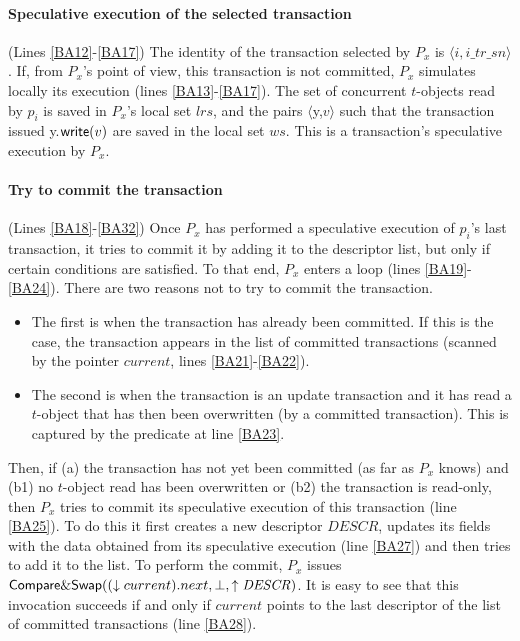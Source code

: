 \paragraph{Speculative execution of the selected  transaction} 
(Lines \ref{BA12}-\ref{BA17}) 
The identity of the transaction selected by $P_x$ is 
$\langle i,  i\_tr\_sn \rangle$. 
If,  from $P_x$'s point of view, this transaction  is not committed, $P_x$ 
simulates locally its execution (lines \ref{BA13}-\ref{BA17}).
The set of concurrent $t$-objects read by $p_i$ is  saved in $P_x$'s local
set $\mathit{lrs}$, and the  pairs $\langle${\sc y},$v\rangle$ 
such that the transaction issued {\sc y}.${\sf write}(v)$ are saved in 
the local set $ws$. This is a transaction's speculative execution by $P_x$. 

\paragraph{Try to commit the transaction}
 (Lines \ref{BA18}-\ref{BA32}) Once $P_x$ has performed a speculative
 execution of $p_i$'s  last transaction, it tries to commit  it by adding it
to the descriptor list, but only if certain conditions are satisfied.
To that end, $P_x$  enters a loop (lines \ref{BA19}-\ref{BA24}). 
There are two reasons not to try to commit the transaction.
%
\begin{itemize}
\item
The first is when  the transaction has already  been committed. 
If this is the case, the transaction  appears in the list of committed 
transactions (scanned by the pointer $current$, lines \ref{BA21}-\ref{BA22}).
%
\item
The second is when the transaction is an update transaction and it
has read a $t$-object that  has then been overwritten (by a committed 
transaction). This is  captured by the predicate at line \ref{BA23}.
\end{itemize}

Then, if (a) the  transaction has not yet been  committed 
(as far as $P_x$ knows) and (b1) no $t$-object read has been overwritten  or 
(b2) the transaction is read-only, then $P_x$ tries to
commit its speculative execution of this transaction (line \ref{BA25}).
To do this it first creates a new descriptor $\mathit{DESCR}$,
updates its fields  with the data obtained from its speculative execution
 (line \ref{BA27}) and then tries to add it to the list. 
%
To perform  the commit, $P_x$ issues ${\sf Compare\&Swap}
((\downarrow current).next,\bot,\uparrow \mathit{DESCR})$.
It is easy to see that this invocation succeeds if and only if $current$ 
points to the last  descriptor of the list of committed transactions 
(line \ref{BA28}).

